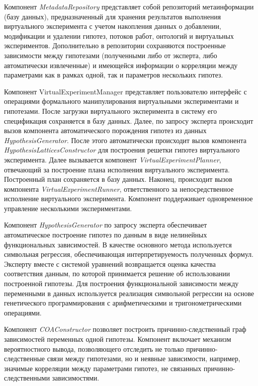 Компонент \textit{MetadataRepository} представляет собой репозиторий метаинформации (базу данных), предназначенный для хранения 
результатов выполнения виртуального эксперимента с учетом накопления данных о добавлении, модификации и удалении 
гипотез, потоков работ, онтологий и виртуальных экспериментов. Дополнительно в репозитории сохраняются построенные 
зависимости между гипотезами (полученными либо от эксперта, либо автоматически извлеченные) и имеющейся информации 
о корреляции между параметрами как в рамках одной, так и параметров нескольких гипотез.

Компонент VirtualExperimentManager представляет пользователю интерфейс с операциями формального манипулирования 
виртуальными экспериментами и гипотезами. После загрузки виртуального эксперимента в систему его спецификация 
сохраняется в базу данных. Далее, по запросу эксперта происходит вызов компонента автоматического порождения 
гипотез из данных \textit{HypothesisGenerator}. После этого автоматически происходит вызов компонента 
\textit{HypothesisLatticesConstructor} для построения решетки гипотез виртуального эксперимента. Далее вызывается компонент 
\textit{VirtualExperimentPlanner}, отвечающий за построение плана исполнения виртуального эксперимента. Построенный план 
сохраняется в базу данных. Наконец, происходит вызов компонента \textit{VirtualExperimentRunner}, ответственного за 
непосредственное исполнение виртуального эксперимента. Компонент поддерживает одновременное управление 
несколькими экспериментами.

Компонент \textit{HypothesisGenerator} по запросу эксперта обеспечивает автоматическое построение гипотез по данным в виде 
нелинейных функциональных зависимостей. В качестве основного метода используется символьная регрессия, обеспечивающая 
интерпретируемость полученных формул. Эксперту вместе с системой уравнений возвращается оценка качества соответствия 
данным, по которой принимается решение об использовании построенной гипотезы. Для построения функциональной зависимости 
между переменными в данных используется реализация символьной регрессии на основе генетического программирования 
с арифметическими и тригонометрическими операциями. 

Компонент \textit{COAConstructor} позволяет построить причинно-следственный граф зависимостей переменных одной гипотезы. 
Компонент включает механизм вероятностного вывода, позволяющего отследить не только причинно-следственные связи между 
гипотезами, но и неявные зависимости, например, значимые корреляции между параметрами гипотез, не связанных 
причинно-следственными зависимостями.

